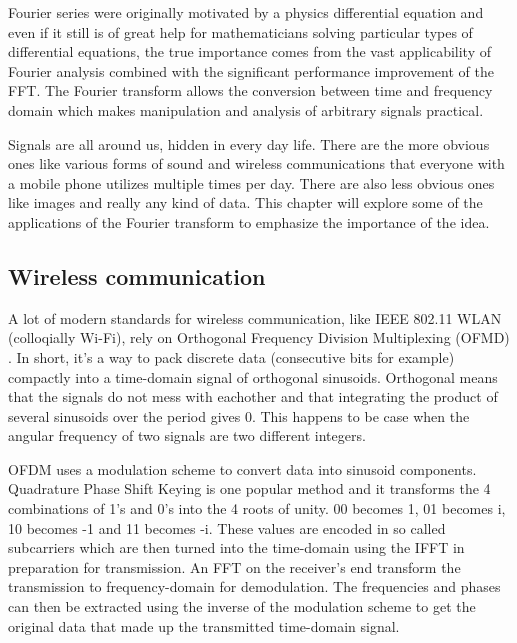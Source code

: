 Fourier series were originally motivated by a physics differential equation and even if it still is of great help for mathematicians solving particular types of differential equations, the true importance comes from the vast applicability of Fourier analysis combined with the significant performance improvement of the FFT. The Fourier transform allows the conversion between time and frequency domain which makes manipulation and analysis of arbitrary signals practical. 

Signals are all around us, hidden in every day life. There are the more obvious ones like various forms of sound and wireless communications that everyone with a mobile phone utilizes multiple times per day. There are also less obvious ones like images and really any kind of data. This chapter will explore some of the applications of the Fourier transform to emphasize the importance of the idea. 

\subsection{Wireless communication}
A lot of modern standards for wireless communication, like IEEE 802.11 WLAN (colloqially Wi-Fi), rely on Orthogonal Frequency Division Multiplexing (OFMD) . In short, it's a way to pack discrete data (consecutive bits for example) compactly into a time-domain signal of orthogonal sinusoids. Orthogonal means that the signals do not mess with eachother and that integrating the product of several sinusoids over the period gives 0. This happens to be case when the angular frequency of two signals are two different integers. 

OFDM uses a modulation scheme to convert data into sinusoid components. Quadrature Phase Shift Keying is one popular method and it transforms the 4 combinations of 1's and 0's into the 4 roots of unity. 00 becomes 1, 01 becomes i, 10 becomes -1 and 11 becomes -i. These values are encoded in so called subcarriers which are then turned into the time-domain using the IFFT in preparation for transmission. An FFT on the receiver's end transform the transmission to frequency-domain for demodulation. The frequencies and phases can then be extracted using the inverse of the modulation scheme to get the original data that made up the transmitted time-domain signal.

